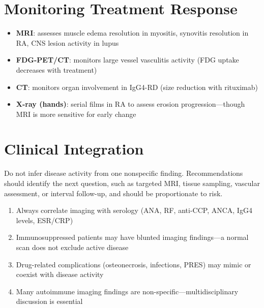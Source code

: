 \section{Monitoring Treatment Response}
\begin{itemize}
  \item \textbf{MRI}: assesses muscle edema resolution in myositis, synovitis resolution in RA, CNS lesion activity in lupus
  \item \textbf{FDG-PET/CT}: monitors large vessel vasculitis activity (FDG uptake decreases with treatment)
  \item \textbf{CT}: monitors organ involvement in IgG4-RD (size reduction with rituximab)
  \item \textbf{X-ray (hands)}: serial films in RA to assess erosion progression---though MRI is more sensitive for early change
\end{itemize}

\section{Clinical Integration}
Do not infer disease activity from one nonspecific finding. Recommendations should identify the next question, such as targeted MRI, tissue sampling, vascular assessment, or interval follow-up, and should be proportionate to risk.

\begin{pearlbox}
\begin{enumerate}
  \item Always correlate imaging with serology (ANA, RF, anti-CCP, ANCA, IgG4 levels, ESR/CRP)
  \item Immunosuppressed patients may have blunted imaging findings---a normal scan does not exclude active disease
  \item Drug-related complications (osteonecrosis, infections, PRES) may mimic or coexist with disease activity
  \item Many autoimmune imaging findings are non-specific---multidisciplinary discussion is essential
\end{enumerate}
\end{pearlbox}

\clearpage
